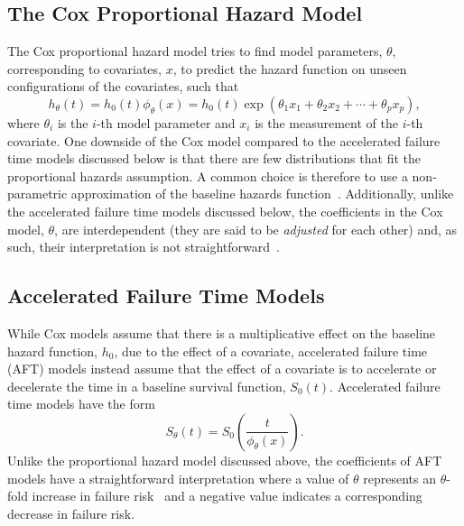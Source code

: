\subsection{The Cox Proportional Hazard Model}
The Cox proportional hazard model tries to find model parameters, $\theta$, corresponding to covariates, $x$, to predict the hazard function on unseen configurations of the covariates, such that
\[
    h_\theta(t) = h_0(t)\phi_\theta(x) = h_0(t) \exp(\theta_1 x_1 + \theta_2 x_2 + \cdots + \theta_p x_p),
\]
where $\theta_i$ is the $i$-th model parameter and $x_i$ is the measurement of the $i$-th covariate. One downside of the Cox model compared to the accelerated failure time models discussed below is that there are few distributions that fit the proportional hazards assumption. A common choice is therefore to use a non-parametric approximation of the baseline hazards function~\cite{collett2023modelling}.
Additionally, unlike the accelerated failure time models discussed below, the coefficients in the Cox model, $\theta$, are interdependent (they are said to be \textit{adjusted} for each other) and, as such, their interpretation is not straightforward~\cite{collett2023modelling}.

\subsection{Accelerated Failure Time Models}
While Cox models assume that there is a multiplicative effect on the baseline hazard function, $h_0$, due to the effect of a covariate, accelerated failure time (AFT) models instead assume that the effect of a covariate is to accelerate or decelerate the time in a baseline survival function, $S_0(t)$.
Accelerated failure time models have the form
\begin{equation} \label{eq:def_aft_model}
	S_\theta(t) = S_0 \left( \frac{t}{\phi_\theta(x)} \right).
\end{equation}
Unlike the proportional hazard model discussed above, the coefficients of AFT models have a straightforward interpretation where a value of $\theta$ represents an $\theta$-fold increase in failure risk~\cite{collett2023modelling} and a negative value indicates a corresponding decrease in failure risk.

